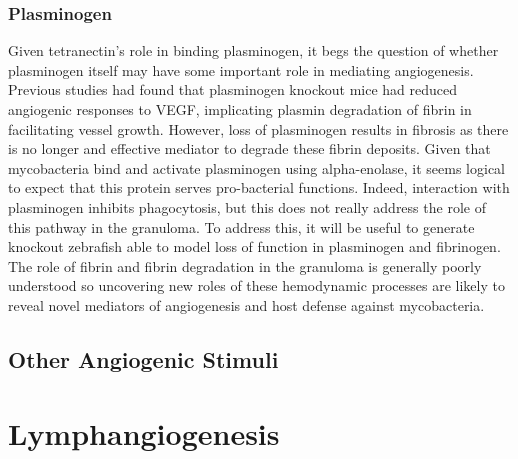 \subsubsection{Plasminogen}

Given tetranectin's role in binding plasminogen, it begs the question of whether plasminogen itself may have some important role in mediating angiogenesis. Previous studies had found that plasminogen knockout mice had reduced angiogenic responses to VEGF, implicating plasmin degradation of fibrin in facilitating vessel growth. However, loss of plasminogen results in fibrosis as there is no longer and effective mediator to degrade these fibrin deposits. Given that mycobacteria bind and activate plasminogen using alpha-enolase, it seems logical to expect that this protein serves pro-bacterial functions. Indeed, interaction with plasminogen inhibits phagocytosis, but this does not really address the role of this pathway in the granuloma. To address this, it will be useful to generate knockout zebrafish able to model loss of function in plasminogen and fibrinogen. The role of fibrin and fibrin degradation in the granuloma is generally poorly understood so uncovering new roles of these hemodynamic processes are likely to reveal novel mediators of angiogenesis and host defense against mycobacteria.

\citep{Sakamoto2010}


\subsection{Other Angiogenic Stimuli}

\citep{Jeon2007, Liu2014, Sugden2017, Ubil2014, Wu2007}
\citep{Correa2014}

\section{Lymphangiogenesis}


